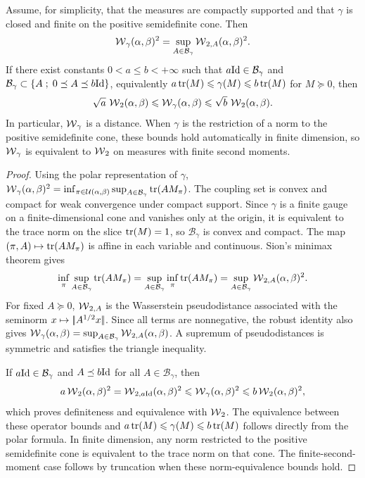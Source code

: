 \begin{prop}\label{prop-spectral-wasserstein-robust}
	Assume, for simplicity, that the measures are compactly supported and that $\gamma$ is closed and finite on the positive semidefinite cone. Then
	\[
		\operatorname{\mathcal{W}}_\gamma(\alpha,\beta)^2
		=
		\sup_{A\in\mathcal B_\gamma}
		\operatorname{\mathcal{W}}_{2,A}(\alpha,\beta)^2.
	\]
	If there exist constants $0<a\leq b<+\infty$ such that $a\mathrm{Id}\in\mathcal B_\gamma$ and $\mathcal B_\gamma\subset\left\{ A \;;\; 0\preceq A\preceq b\mathrm{Id} \right\}$, equivalently
	$a\operatorname{tr}(M)\leqslant\gamma(M)\leqslant b\operatorname{tr}(M)$ for $M\succeq0$,
	then
	\[
		\sqrt a\,\operatorname{\mathcal{W}}_2(\alpha,\beta)
		\leqslant
		\operatorname{\mathcal{W}}_\gamma(\alpha,\beta)
		\leqslant
		\sqrt b\,\operatorname{\mathcal{W}}_2(\alpha,\beta).
	\]
	In particular, $\operatorname{\mathcal{W}}_\gamma$ is a distance. When $\gamma$ is the restriction of a norm to the positive semidefinite cone, these bounds hold automatically in finite dimension, so $\operatorname{\mathcal{W}}_\gamma$ is equivalent to $\operatorname{\mathcal{W}}_2$ on measures with finite second moments.
\end{prop}

\begin{proof}
	Using the polar representation of $\gamma$,
	$\operatorname{\mathcal{W}}_\gamma(\alpha,\beta)^2 = \inf_{\pi\in\mathcal{U}(\alpha,\beta)} \sup_{A\in\mathcal B_\gamma}\operatorname{tr}(AM_\pi)$.
	The coupling set is convex and compact for weak convergence under compact support. Since $\gamma$ is a finite gauge on a finite-dimensional cone and vanishes only at the origin, it is equivalent to the trace norm on the slice $\operatorname{tr}(M)=1$, so $\mathcal B_\gamma$ is convex and compact. The map $(\pi,A)\mapsto\operatorname{tr}(AM_\pi)$ is affine in each variable and continuous. Sion's minimax theorem gives
	\[
		\inf_\pi\sup_{A\in\mathcal B_\gamma}\operatorname{tr}(AM_\pi)
		=
		\sup_{A\in\mathcal B_\gamma}\inf_\pi\operatorname{tr}(AM_\pi)
		=
		\sup_{A\in\mathcal B_\gamma}\operatorname{\mathcal{W}}_{2,A}(\alpha,\beta)^2.
	\]
	For fixed $A\succeq0$, $\operatorname{\mathcal{W}}_{2,A}$ is the Wasserstein pseudodistance associated with the seminorm $x\mapsto|\!| A^{1/2}x |\!|$. Since all terms are nonnegative, the robust identity also gives
	$\operatorname{\mathcal{W}}_\gamma(\alpha,\beta) = \sup_{A\in\mathcal B_\gamma}\operatorname{\mathcal{W}}_{2,A}(\alpha,\beta)$.
	A supremum of pseudodistances is symmetric and satisfies the triangle inequality.

	If $a\mathrm{Id}\in\mathcal B_\gamma$ and $A\preceq b\mathrm{Id}$ for all $A\in\mathcal B_\gamma$, then
	\[
		a\operatorname{\mathcal{W}}_2(\alpha,\beta)^2
		=
		\operatorname{\mathcal{W}}_{2,a\mathrm{Id}}(\alpha,\beta)^2
		\leqslant
		\operatorname{\mathcal{W}}_\gamma(\alpha,\beta)^2
		\leqslant
		b\operatorname{\mathcal{W}}_2(\alpha,\beta)^2,
	\]
	which proves definiteness and equivalence with $\operatorname{\mathcal{W}}_2$. The equivalence between these operator bounds and $a\operatorname{tr}(M)\leqslant\gamma(M)\leqslant b\operatorname{tr}(M)$ follows directly from the polar formula. In finite dimension, any norm restricted to the positive semidefinite cone is equivalent to the trace norm on that cone. The finite-second-moment case follows by truncation when these norm-equivalence bounds hold.
\end{proof}

